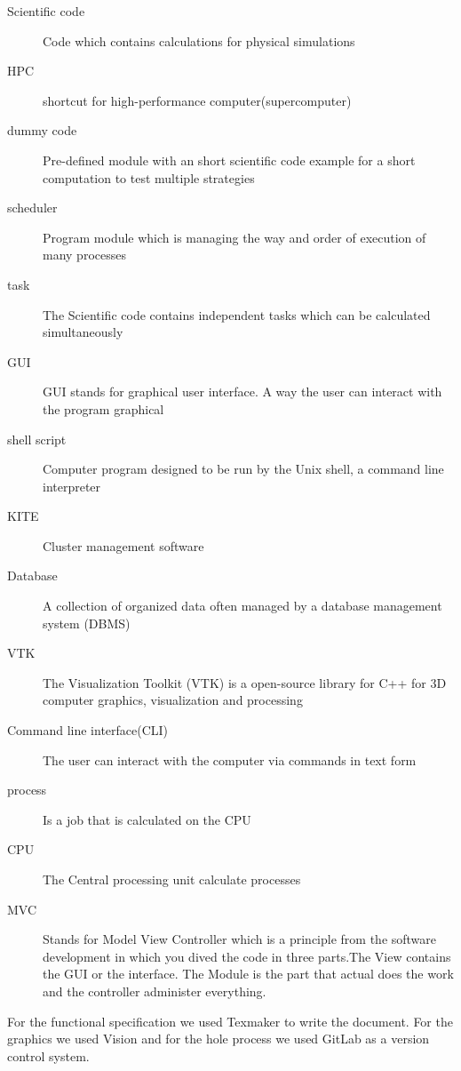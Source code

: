 \begin{description}
	\item[Scientific code] Code which contains calculations for physical simulations
	
	\item[HPC] shortcut for high-performance computer(supercomputer)
	
	\item[dummy code] Pre-defined module with an short scientific code example for a short computation to test multiple strategies
	
	\item[scheduler] Program module which is managing the way and order of execution of many processes
	
	\item[task] The Scientific code contains independent tasks which can be calculated simultaneously
	
	\item[GUI] GUI stands for graphical user interface. A way the user can interact with the program graphical
	
	\item[shell script] Computer program designed to be run by the Unix shell, a command line interpreter
	
	\item[KITE] Cluster management software
	
	\item[Database] A collection of organized data often managed by a database management system (DBMS)
	
	\item[VTK] The Visualization Toolkit (VTK)  is a open-source library for C++ for 3D computer graphics, visualization and processing
	
	\item[Command line interface(CLI)] The user can interact with the computer via commands in text form
	
	\item[process] Is a job that is calculated on the CPU
	
	\item[CPU] The Central processing unit calculate processes
	
	\item[MVC] Stands for Model View Controller which is a principle from the software development in which you dived the code in three parts.The View contains the GUI or the interface. The Module is the part that actual does the work and the controller administer everything.

\end{description}

For the functional specification we used Texmaker to write the document. For the graphics we used Vision and for the hole process we used GitLab as a version control system.